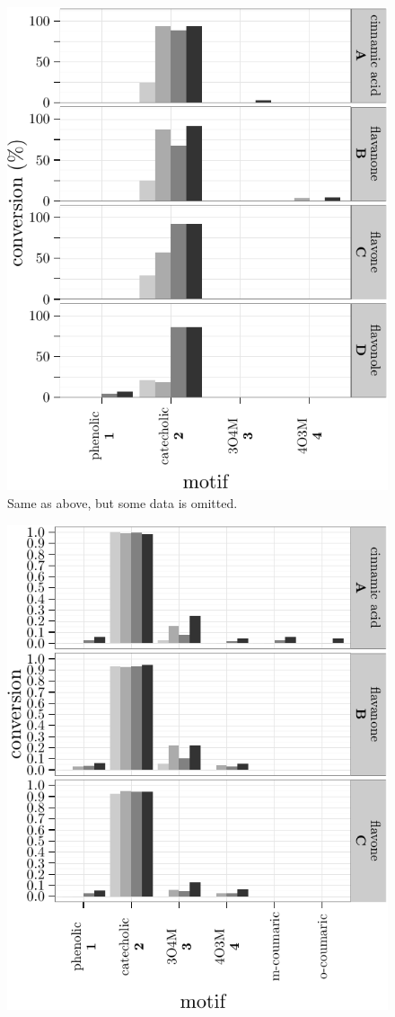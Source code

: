 \documentclass[]{tufte-handout}
\begin{document}
\begin{figure}
 \includegraphics{tufte_files/figure-latex/unnamed-chunk-15-5.pdf}
\caption{Same as above, but some data is omitted.}
\end{figure}\begin{figure}
 \includegraphics{tufte_files/figure-latex/unnamed-chunk-15-6.pdf}

\end{figure}
\end{document}
